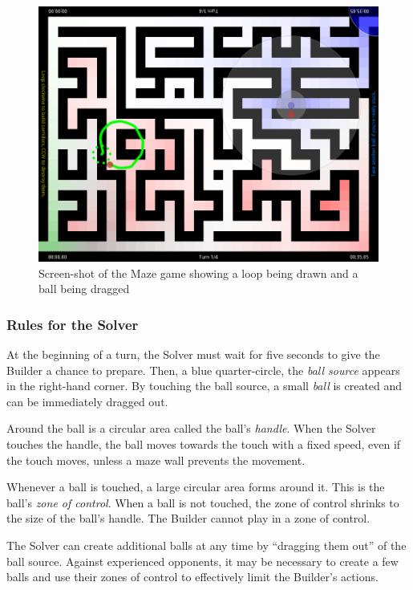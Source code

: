 \documentclass[a4paper,11pt]{article}
\begin{document}
\begin{figure}[ht]
    \includegraphics[width=13cm]{scsh-maze}
\caption{Screen-shot of the Maze game showing a loop being drawn and a ball
being dragged}
\label{scsh-maze}
\end{figure}

\subsubsection{Rules for the Solver}

At the beginning of a turn, the Solver must wait for five seconds to give the
Builder a chance to prepare.
Then, a blue quarter-circle, the \emph{ball source} appears in the right-hand
corner.
By touching the ball source, a small \emph{ball} is created and can be
immediately dragged out.

Around the ball is a circular area called the ball's \emph{handle}.
When the Solver touches the handle, the ball moves towards the touch with a
fixed speed, even if the touch moves, unless a maze wall prevents the movement.

Whenever a ball is touched, a large circular area forms around it.
This is the ball's \emph{zone of control}.
When a ball is not touched, the zone of control shrinks to the size of the
ball's handle.
The Builder cannot play in a zone of control.

The Solver can create additional balls at any time by “dragging them out”
of the ball source.
Against experienced opponents, it may be necessary to create a few balls and
use their zones of control to effectively limit the Builder's actions.
\end{document}
